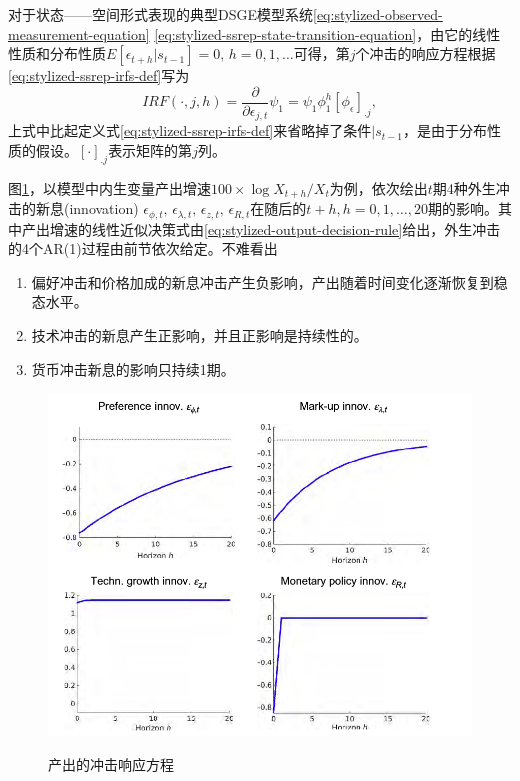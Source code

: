 对于状态——空间形式表现的典型DSGE模型系统\eqref{eq:stylized-observed-measurement-equation} \eqref{eq:stylized-ssrep-state-transition-equation}，由它的线性性质和分布性质$E \left[ \epsilon_{t+h} | s_{t-1} \right] = 0, \, h=0,1,\ldots $可得，第$j$个冲击的响应方程根据\eqref{eq:stylized-ssrep-irfs-def}写为
\begin{equation}
  \label{eq:stylized-ssrep-irfs}
  IRF \left( \cdot , j, h \right) =
  \frac{\partial}{\partial \epsilon_{j,t}} \psi_{1}
  = \psi_{1} \phi_{1}^{h} \left[ \phi_{\epsilon} \right]_{.j},
\end{equation}
上式中比起定义式\eqref{eq:stylized-ssrep-irfs-def}来省略掉了条件$| s_{t-1}$，是由于分布性质的假设。$\left[ \cdot \right]_{.j}$表示矩阵的第$j$列。

图\ref{fig:stylized-ssrep-irfs-output}，以模型中内生变量产出增速$ 100 \times \log X_{t+h}/X_{t}$为例，依次绘出$t$期4种外生冲击的新息(innovation) $\epsilon_{\phi,t}, \, \epsilon_{\lambda,t}, \, \epsilon_{z,t}, \, \epsilon_{R,t}$在随后的$t+h, h=0,1,\ldots,20$期的影响。其中产出增速的线性近似决策式由\eqref{eq:stylized-output-decision-rule}给出，外生冲击的4个AR(1)过程由前节依次给定。不难看出
\begin{enumerate}
  \item 偏好冲击和价格加成的新息冲击产生负影响，产出随着时间变化逐渐恢复到稳态水平。
  \item 技术冲击的新息产生正影响，并且正影响是持续性的。
  \item 货币冲击新息的影响只持续1期。
\end{enumerate}

\begin{figure}[htbp]
  \caption{产出的冲击响应方程}
  \centering
  \includegraphics[width=12cm]{./Figures/20180403-irfs-output}
  \label{fig:stylized-ssrep-irfs-output}
%
\end{figure}

